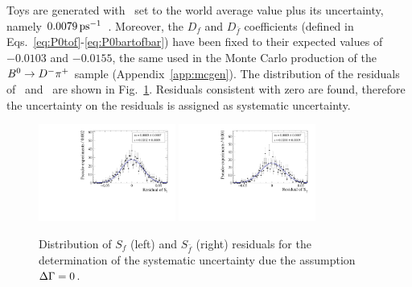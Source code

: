 Toys are generated with \DG~set to the world average value plus its uncertainty, namely $0.0079{\rm \,ps}^{-1}$~\cite{HFAG}.
Moreover, the $D_{f}$ and $D_{\bar f}$ coefficients (defined in Eqs.~\ref{eq:P0tof}-\ref{eq:P0bartofbar}) have been fixed to their expected values of $-0.0103$ and $-0.0155$,
the same used in the Monte Carlo production of the $B^0\rightarrow D^-\pi^+$ sample (Appendix~\ref{app:mcgen}). The distribution of the residuals of \Sf~and
\Sfb~are shown in Fig.~\ref{fig:DGSystToys}. Residuals consistent with zero are found, therefore the uncertainty
on the residuals is assigned as systematic uncertainty.
\begin{figure}[t]
	\begin{center}
		\includegraphics[width=0.4\textwidth]{06Systematics/figs/DG_Sf_res.pdf}
		\includegraphics[width=0.4\textwidth]{06Systematics/figs/DG_Sfbar_res.pdf}
	\end{center}
        \vspace{-2mm}
	\caption{Distribution of $S_f$ (left) and $S_{\bar f}$ (right) residuals for the determination of the systematic uncertainty due the assumption $\Delta\Gamma=0$.}
	\label{fig:DGSystToys}
\end{figure}

